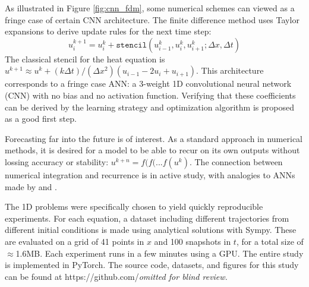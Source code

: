 \documentclass{article}
\begin{document}
As illustrated in Figure \ref{fig:cnn_fdm}, some numerical schemes
can viewed as a fringe case of certain CNN architecture. The finite
difference method uses Taylor expansions to derive update rules for the next time step:
\begin{equation}
  u^{k+1}_{i} = u^k_{i}+\mathtt{stencil}\left( u^k_{i-1}, u^k_{i},u^{k}_{i+1}; \Delta x, \Delta t\right)
\end{equation}
The classical stencil for the heat equation is
$u^{k+1}\approx u^k+(k\Delta t)/(\Delta x^2) \left(u_{i-1} - 2 u_{i} +
  u_{i+1}\right)$.
This architecture corresponds to a fringe case ANN: a
3-weight 1D convolutional neural network (CNN) with no bias and no
activation function. Verifying that
these coefficients can be derived
by the learning strategy and optimization algorithm is proposed as a good first step.


Forecasting far into the future is of interest. As a standard approach
in numerical methods, it is desired for a model to be able to recur on
its own outputs without lossing accuracy or stability:
$u^{k+n}=f(f(...f(u^k)$. The connection between numerical integration
and recurrence is in active study, with analogies to ANNs made by
\citet{chen_neural_2018} and \citet{chang_multi-level_2017}.

The 1D problems were specifically chosen to yield quickly reproducible
experiments. For each equation, a dataset
including different trajectories from different initial conditions is made
using analytical solutions with Sympy. These are evaluated on a grid of 41 points in $x$ and 100
snapshots in $t$, for a total size of $\approx$1.6MB. Each experiment runs
in a few minutes using a GPU. The
entire study is implemented in PyTorch. The source code, datasets,
and figures for this study can be found at https://github.com/{\em omitted for blind review.}


\end{document}
